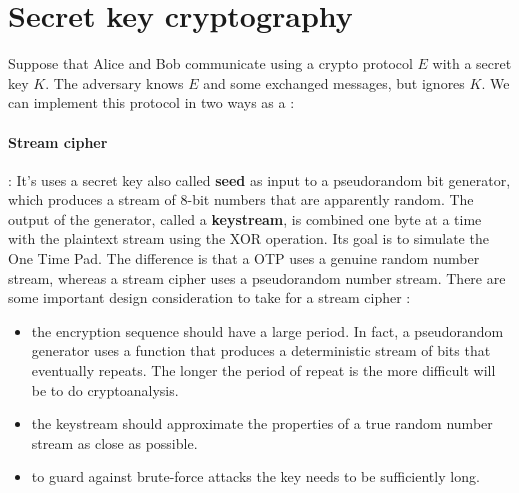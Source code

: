 \documentclass[11pt]{article}
\begin{document}
\section{Secret key cryptography}
Suppose that Alice and Bob communicate using a crypto protocol $E$ with a secret key $K$. The adversary knows $E$ and some exchanged messages, but ignores $K$. We can implement this protocol in two ways as a :
\paragraph{Stream cipher} : It's uses a secret key also called \textbf{seed} as input to a pseudorandom bit generator, which produces a stream of 8-bit numbers that are apparently random. The output of the generator, called a \textbf{keystream}, is combined one byte at a time with the plaintext stream using the XOR operation. Its goal is to simulate the One Time Pad. The difference is that a OTP uses a genuine random number stream, whereas a stream cipher uses a pseudorandom number stream. There are some important design consideration to take for a stream cipher :
\begin{itemize}
\item the encryption sequence should have a large period. In fact, a pseudorandom generator uses a function that produces a deterministic stream of bits that eventually repeats. The longer the period of repeat is the more difficult will be to do cryptoanalysis.
\item the keystream should approximate the properties of a true random number stream as close as possible.
\item to guard against brute-force attacks the key needs to be sufficiently long.
\end{itemize}
\end{document}
